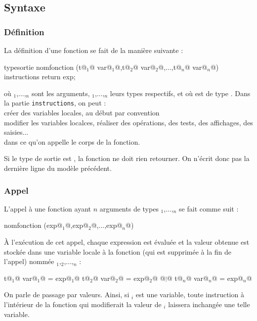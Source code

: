 	\subsection{Syntaxe}
	
		\subsubsection{Définition}
		La définition d'une fonction se fait de la manière suivante :
			\begin{C}
				typesortie nomfonction (t@$_1$@ var@$_1$@,t@$_2$@ var@$_2$@,...,t@$_n$@ var@$_n$@){
					instructions
					return exp;
				}
			\end{C}
		où $_1$,...,$_n$ sont les arguments, $_1$,...,$_n$ leurs types respectifs, et où  est de type . \nll
		Dans la partie \texttt{instructions}, on peut : \\
			 \bdot créer des variables locales, au début par convention \\
			 \bdot modifier les variables localces, réaliser des opérations, des tests, des affichages, des saisies... \\  \listspace dans ce qu'on appelle le corps de la fonction.
		
		\begin{Remarque}
			Si le type de sortie est , la fonction ne doit rien retourner. On n'écrit donc pas la dernière ligne du modèle précédent.
		\end{Remarque}
			
		\subsubsection{Appel}
		
		L'appel à une fonction ayant \(n\) arguments de types $_1$,...,$_n$ se fait comme suit :
			\begin{C}
						nomfonction (exp@$_1$@,exp@$_2$@,...,exp@$_n$@)
			\end{C}
		\`A l'exécution de cet appel, chaque expression est évaluée et la valeur obtenue est stockée dans une variable locale à la fonction (qui est supprimée à la fin de l'appel) nommée $_1$,$_2$,...,$_n$ :
			\begin{C}
									t@$_1$@ var@$_1$@ = exp@$_1$@
									t@$_2$@ var@$_2$@ = exp@$_2$@
										@$\vdots$@
									t@$_n$@ var@$_n$@ = exp@$_n$@
			\end{C}
		On parle de passage par valeurs. Ainsi, si $_i$ est une variable, toute instruction à l'intérieur de la fonction qui modifierait la valeur de $_i$ laissera inchangée une telle variable.
		
